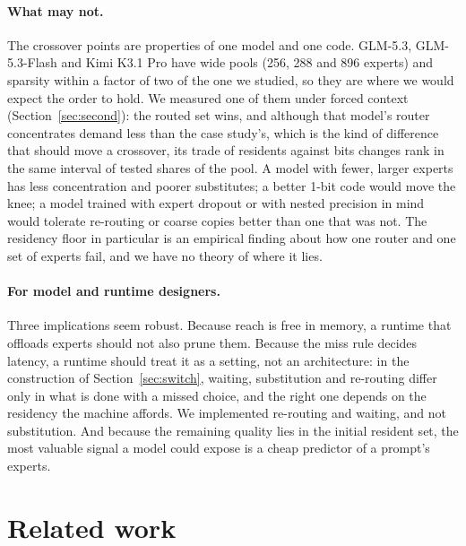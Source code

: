 \documentclass[11pt]{article}
\begin{document}
\paragraph{What may not.} The crossover points are properties of one model and one code. GLM-5.3, GLM-5.3-Flash and
Kimi K3.1 Pro have wide pools (256, 288 and 896 experts) and sparsity within a factor of two of the one we studied, so
they are where we would expect the order to hold. We measured one of them under forced context (Section~\ref{sec:second}): the routed set wins, and although that model's router concentrates demand less than the case study's, which is the kind of difference that should move a crossover, its trade of residents against bits changes rank in the same interval of tested shares of the pool. A
model with fewer, larger experts has less concentration and poorer substitutes; a better 1-bit
code would move the knee; a model trained with expert dropout or with nested precision in mind
\citep{wei2026matmoe} would tolerate re-routing or coarse copies better than one that was not.
The residency floor in particular is an empirical finding about how one router and one set of
experts fail, and we have no theory of where it lies.

\paragraph{For model and runtime designers.} Three implications seem robust. Because reach is
free in memory, a runtime that offloads experts should not also prune them. Because the
miss rule decides latency, a runtime should treat it as a setting, not an architecture: in the construction of Section~\ref{sec:switch}, waiting, substitution and re-routing differ only in what is done with a missed choice, and the right one depends on the residency the machine affords. We implemented re-routing and waiting, and not substitution. And because the remaining
quality lies in the initial resident set, the most valuable signal a model could expose is a
cheap predictor of a prompt's experts.

\section{Related work}
\label{sec:related}
\end{document}
